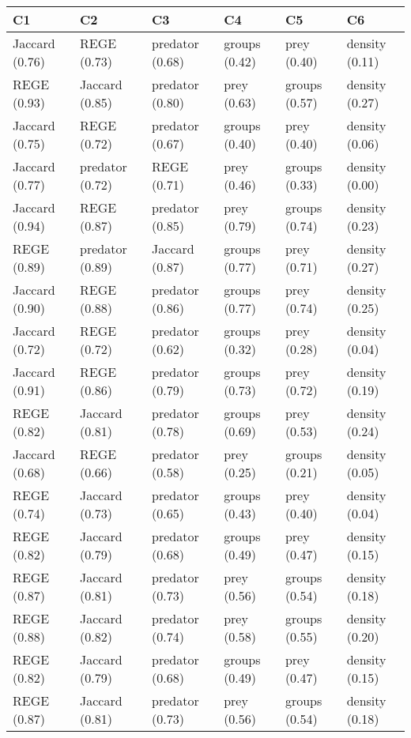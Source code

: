 \begin{table}[ht]
\centering
\begin{tabular}{llllll}
  \hline
C1 & C2 & C3 & C4 & C5 & C6 \\ 
  \hline
Jaccard (0.76) & REGE (0.73) & predator (0.68) & groups (0.42) & prey (0.40) & density (0.11) \\ 
  REGE (0.93) & Jaccard (0.85) & predator (0.80) & prey (0.63) & groups (0.57) & density (0.27) \\ 
  Jaccard (0.75) & REGE (0.72) & predator (0.67) & groups (0.40) & prey (0.40) & density (0.06) \\ 
  Jaccard (0.77) & predator (0.72) & REGE (0.71) & prey (0.46) & groups (0.33) & density (0.00) \\ 
  Jaccard (0.94) & REGE (0.87) & predator (0.85) & prey (0.79) & groups (0.74) & density (0.23) \\ 
  REGE (0.89) & predator (0.89) & Jaccard (0.87) & groups (0.77) & prey (0.71) & density (0.27) \\ 
  Jaccard (0.90) & REGE (0.88) & predator (0.86) & groups (0.77) & prey (0.74) & density (0.25) \\ 
  Jaccard (0.72) & REGE (0.72) & predator (0.62) & groups (0.32) & prey (0.28) & density (0.04) \\ 
  Jaccard (0.91) & REGE (0.86) & predator (0.79) & groups (0.73) & prey (0.72) & density (0.19) \\ 
  REGE (0.82) & Jaccard (0.81) & predator (0.78) & groups (0.69) & prey (0.53) & density (0.24) \\ 
  Jaccard (0.68) & REGE (0.66) & predator (0.58) & prey (0.25) & groups (0.21) & density (0.05) \\ 
  REGE (0.74) & Jaccard (0.73) & predator (0.65) & groups (0.43) & prey (0.40) & density (0.04) \\ 
  REGE (0.82) & Jaccard (0.79) & predator (0.68) & groups (0.49) & prey (0.47) & density (0.15) \\ 
  REGE (0.87) & Jaccard (0.81) & predator (0.73) & prey (0.56) & groups (0.54) & density (0.18) \\ 
  REGE (0.88) & Jaccard (0.82) & predator (0.74) & prey (0.58) & groups (0.55) & density (0.20) \\ 
  REGE (0.82) & Jaccard (0.79) & predator (0.68) & groups (0.49) & prey (0.47) & density (0.15) \\ 
  REGE (0.87) & Jaccard (0.81) & predator (0.73) & prey (0.56) & groups (0.54) & density (0.18) \\ 

\end{tabular}
\end{table}
